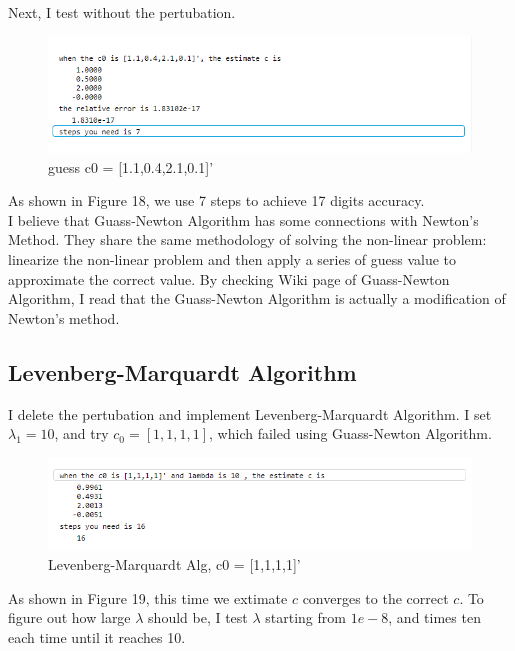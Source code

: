 \documentclass[a4paper]{article}
\begin{document}
Next, I test without the pertubation. 

\begin{figure}[H] 
\centering 
\includegraphics[width=1.0\textwidth]{2.2-9.png}
\caption{guess c0 = [1.1,0.4,2.1,0.1]'} 
\label{Fig.2.2-9} 
\end{figure}

As shown in Figure 18, we use 7 steps to achieve 17 digits accuracy.\\
\indent I believe that Guass-Newton Algorithm has some connections with Newton's Method. They share the same methodology of solving the non-linear problem: linearize the non-linear problem and then apply a series of guess value to approximate the correct value. By checking Wiki page of Guass-Newton Algorithm, I read that the Guass-Newton Algorithm is actually a modification of Newton's method.

\subsection{Levenberg-Marquardt Algorithm}
I delete the pertubation and implement Levenberg-Marquardt Algorithm. I set $\lambda_{1} = 10$, and try $c_{0}=[1,1,1,1]$, which failed using Guass-Newton Algorithm.

\begin{figure}[H] 
\centering 
\includegraphics[width=1.0\textwidth]{2.3-1.png}
\caption{Levenberg-Marquardt Alg, c0 = [1,1,1,1]'} 
\label{Fig.2.3-1} 
\end{figure}

As shown in Figure 19, this time we extimate $c$ converges to the correct $c$. To figure out how large $\lambda$ should be, I test $\lambda$ starting from $1e-8$, and times ten each time until it reaches 10.
\end{document}
